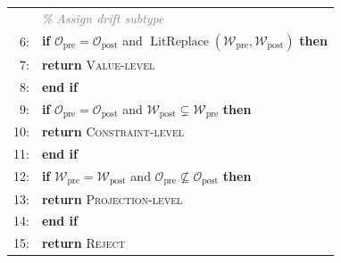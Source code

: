 \begin{algorithm}[t]
\begin{tabularx}{\linewidth}{
    @{}r@{\hspace{0.75em}}
    >{\raggedright\arraybackslash}X@{}
}
&
\textcolor{gray}{\itshape\% Assign drift subtype}
\\[0pt]

6: &
\textbf{if}
$\mathcal{O}_{\mathrm{pre}}=\mathcal{O}_{\mathrm{post}}$
and
$\operatorname{LitReplace}
(\mathcal{W}_{\mathrm{pre}},\mathcal{W}_{\mathrm{post}})$
\textbf{then}
\\

7: &
\hspace*{1.2em}\textbf{return} \textsc{Value-level}
\\

8: &
\textbf{end if}
\\

9: &
\textbf{if}
$\mathcal{O}_{\mathrm{pre}}=\mathcal{O}_{\mathrm{post}}$
and
$\mathcal{W}_{\mathrm{post}}
\subsetneq\mathcal{W}_{\mathrm{pre}}$
\textbf{then}
\\

10: &
\hspace*{1.2em}\textbf{return} \textsc{Constraint-level}
\\

11: &
\textbf{end if}
\\

12: &
\textbf{if}
$\mathcal{W}_{\mathrm{pre}}=\mathcal{W}_{\mathrm{post}}$
and
$\mathcal{O}_{\mathrm{pre}}
\nsubseteq\mathcal{O}_{\mathrm{post}}$
\textbf{then}
\\

13: &
\hspace*{1.2em}\textbf{return} \textsc{Projection-level}
\\

14: &
\textbf{end if}
\\

15: &
\textbf{return} \textsc{Reject}
\\

\end{tabularx}

\end{algorithm}


